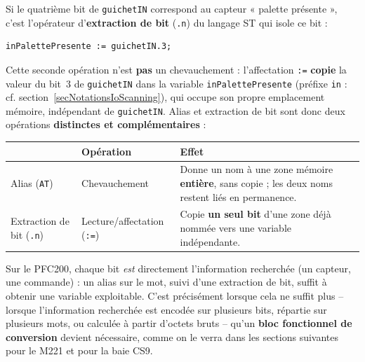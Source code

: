Si le quatrième bit de \texttt{guichetIN} correspond au capteur « palette
présente », c'est l'opérateur d'\textbf{extraction de bit} (\texttt{.n})
du langage ST qui isole ce bit :

\begin{lstlisting}
inPalettePresente := guichetIN.3;
\end{lstlisting}

Cette seconde opération n'est \textbf{pas} un chevauchement : l'affectation
\texttt{:=} \textbf{copie} la valeur du bit~3 de \texttt{guichetIN} dans la
variable \texttt{inPalettePresente} (préfixe \texttt{in} : cf. section~\ref{secNotationsIoScanning}), qui occupe son propre
emplacement mémoire, indépendant de \texttt{guichetIN}. Alias et
extraction de bit sont donc deux opérations \textbf{distinctes et
complémentaires} :

\begin{center}
\begin{tabular}{|l|p{3.6cm}|p{6.3cm}|}
\hline
 & \textbf{Opération} & \textbf{Effet} \\
\hline
Alias (\texttt{AT}) & Chevauchement & Donne un nom à une zone mémoire
\textbf{entière}, sans copie ; les deux noms restent liés en permanence. \\
\hline
Extraction de bit (\texttt{.n}) & Lecture/affectation (\texttt{:=}) & Copie
\textbf{un seul bit} d'une zone déjà nommée vers une variable
indépendante. \\
\hline
\end{tabular}
\end{center}

Sur le PFC200, chaque bit \emph{est} directement l'information recherchée
(un capteur, une commande) : un alias sur le mot, suivi d'une extraction
de bit, suffit à obtenir une variable exploitable. C'est précisément
lorsque cela ne suffit plus -- lorsque l'information recherchée est
encodée sur plusieurs bits, répartie sur plusieurs mots, ou calculée à
partir d'octets bruts -- qu'un \textbf{bloc fonctionnel de conversion}
devient nécessaire, comme on le verra dans les sections suivantes pour le
M221 et pour la baie CS9.

